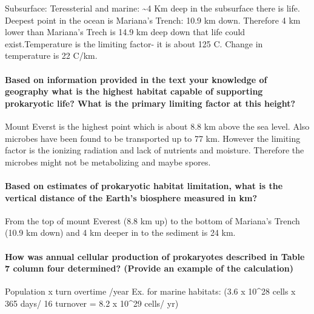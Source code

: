 \documentclass[]{article}
\let\oldparagraph\paragraph
\renewcommand{\paragraph}[1]{\oldparagraph{#1}\mbox{}}
\begin{document}
Subsurface: Teressterial and marine: \textasciitilde{}4 Km deep in the
subsurface there is life. Deepest point in the ocean is Mariana's
Trench: 10.9 km down. Therefore 4 km lower than Mariana's Trech is 14.9
km deep down that life could exist.Temperature is the limiting factor-
it is about 125 C. Change in temperature is 22 C/km.

\paragraph{Based on information provided in the text your knowledge of
geography what is the highest habitat capable of supporting prokaryotic
life? What is the primary limiting factor at this
height?}\label{based-on-information-provided-in-the-text-your-knowledge-of-geography-what-is-the-highest-habitat-capable-of-supporting-prokaryotic-life-what-is-the-primary-limiting-factor-at-this-height}

Mount Everst is the highest point which is about 8.8 km above the sea
level. Also microbes have been found to be transported up to 77 km.
However the limiting factor is the ionizing radiation and lack of
nutrients and moisture. Therefore the microbes might not be metabolizing
and maybe spores.

\paragraph{Based on estimates of prokaryotic habitat limitation, what is
the vertical distance of the Earth's biosphere measured in
km?}\label{based-on-estimates-of-prokaryotic-habitat-limitation-what-is-the-vertical-distance-of-the-earths-biosphere-measured-in-km}

From the top of mount Everest (8.8 km up) to the bottom of Mariana's
Trench (10.9 km down) and 4 km deeper in to the sediment is 24 km.

\paragraph{How was annual cellular production of prokaryotes described
in Table 7 column four determined? (Provide an example of the
calculation)}\label{how-was-annual-cellular-production-of-prokaryotes-described-in-table-7-column-four-determined-provide-an-example-of-the-calculation}

Population x turn overtime /year Ex. for marine habitats: (3.6 x
10\^{}28 cells x 365 days/ 16 turnover = 8.2 x 10\^{}29 cells/ yr)
\end{document}
